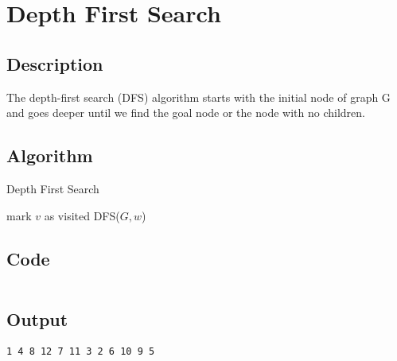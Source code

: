 \section{Depth First Search}

\subsection{Description}
The depth-first search (DFS) algorithm starts with the initial node of graph G and goes deeper until we find the goal
node or the node with no children.

\subsection{Algorithm}


\begin{algorithm}[H]
    \caption{Depth First Search}
    \begin{algorithmic}[1]
        \State mark $v$ as visited
        \State DFS($G, w$)
        \EndFor
        \EndProcedure
    \end{algorithmic}
\end{algorithm}

\pagebreak

\subsection{Code}

\inputminted[fontsize=\footnotesize,bgcolor=bg,linenos,autogobble,frame=single,framerule=0.01pt,rulecolor=FSBorder,stripall,breaklines]{c++}{code/dfs.cpp}

\subsection{Output}

\begin{lstlisting}[style=output]
    1 4 8 12 7 11 3 2 6 10 9 5
\end{lstlisting}

